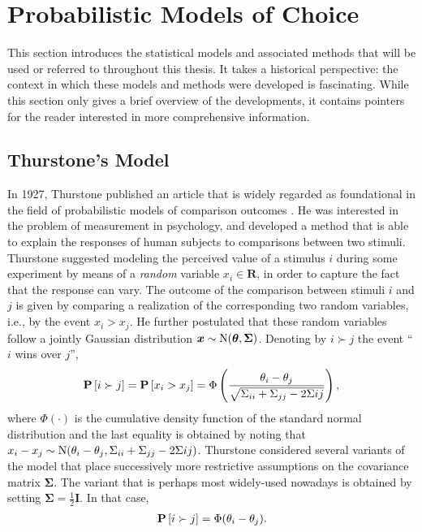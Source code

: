 \section{Probabilistic Models of Choice}
\label{in:sec:models}

This section introduces the statistical models and associated methods that will be used or referred to throughout this thesis.
It takes a historical perspective: the context in which these models and methods were developed is fascinating.
While this section only gives a brief overview of the developments, it contains pointers for the reader interested in more comprehensive information.

\subsection{Thurstone's Model}
In 1927, Thurstone published an article that is widely regarded as foundational in the field of probabilistic models of comparison outcomes \citep{thurstone1927law}.
He was interested in the problem of measurement in psychology, and developed a method that is able to explain the responses of human subjects to comparisons between two stimuli.
Thurstone suggested modeling the perceived value of a stimulus $i$ during some experiment by means of a \emph{random} variable $x_i \in \mathbf{R}$, in order to capture the fact that the response can vary.
The outcome of the comparison between stimuli $i$ and $j$ is given by comparing a realization of the corresponding two random variables, i.e., by the event $x_i > x_j$.
He further postulated that these random variables follow a jointly Gaussian distribution $\bm{x} \sim \mathrm{N}( \bm{\theta}, \bm{\Sigma} )$.
Denoting by $i \succ j$ the event ``$i$ wins over $j$'',
\begin{align*}
\mathbf{P}\left[ i \succ j \right] = \mathbf{P}\left[ x_i > x_j \right] = \Phi \left( \frac{\theta_i - \theta_j}{\sqrt{\Sigma_{ii} + \Sigma_{jj} - 2\Sigma{ij}}} \right),
\end{align*}
where $\Phi(\cdot)$ is the cumulative density function of the standard normal distribution and the last equality is obtained by noting that $x_i - x_j \sim \mathrm{N}( \theta_i - \theta_j, \Sigma_{ii} + \Sigma_{jj} - 2\Sigma{ij} )$.
Thurstone considered several variants of the model that place successively more restrictive assumptions on the covariance matrix $\bm{\Sigma}$.
The variant that is perhaps most widely-used nowadays is obtained by setting $\bm{\Sigma} = \tfrac{1}{2} \bm{I}$.
In that case,
\begin{align}
\label{in:eq:thu5}
\mathbf{P}\left[ i \succ j \right] = \Phi(\theta_i - \theta_j).
\end{align}
